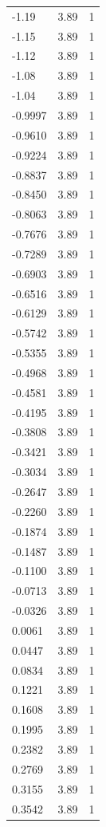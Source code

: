 \begin{longtable}{lrr}
  -1.19 & 3.89 & 1 \\
  -1.15 & 3.89 & 1 \\
  -1.12 & 3.89 & 1 \\
  -1.08 & 3.89 & 1 \\
  -1.04 & 3.89 & 1 \\
  -0.9997 & 3.89 & 1 \\
  -0.9610 & 3.89 & 1 \\
  -0.9224 & 3.89 & 1 \\
  -0.8837 & 3.89 & 1 \\
  -0.8450 & 3.89 & 1 \\
  -0.8063 & 3.89 & 1 \\
  -0.7676 & 3.89 & 1 \\
  -0.7289 & 3.89 & 1 \\
  -0.6903 & 3.89 & 1 \\
  -0.6516 & 3.89 & 1 \\
  -0.6129 & 3.89 & 1 \\
  -0.5742 & 3.89 & 1 \\
  -0.5355 & 3.89 & 1 \\
  -0.4968 & 3.89 & 1 \\
  -0.4581 & 3.89 & 1 \\
  -0.4195 & 3.89 & 1 \\
  -0.3808 & 3.89 & 1 \\
  -0.3421 & 3.89 & 1 \\
  -0.3034 & 3.89 & 1 \\
  -0.2647 & 3.89 & 1 \\
  -0.2260 & 3.89 & 1 \\
  -0.1874 & 3.89 & 1 \\
  -0.1487 & 3.89 & 1 \\
  -0.1100 & 3.89 & 1 \\
  -0.0713 & 3.89 & 1 \\
  -0.0326 & 3.89 & 1 \\
  0.0061 & 3.89 & 1 \\
  0.0447 & 3.89 & 1 \\
  0.0834 & 3.89 & 1 \\
  0.1221 & 3.89 & 1 \\
  0.1608 & 3.89 & 1 \\
  0.1995 & 3.89 & 1 \\
  0.2382 & 3.89 & 1 \\
  0.2769 & 3.89 & 1 \\
  0.3155 & 3.89 & 1 \\
  0.3542 & 3.89 & 1 \\

\end{longtable}
